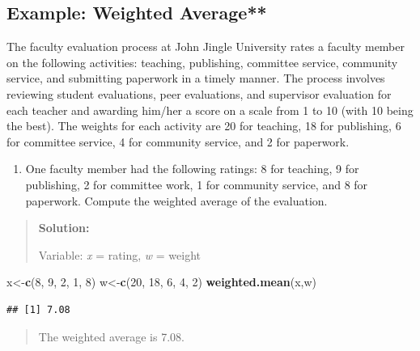 \documentclass[]{book}
\newenvironment{Shaded}{\begin{snugshade}}{\end{snugshade}}
\newcommand{\DecValTok}[1]{\textcolor[rgb]{0.00,0.00,0.81}{#1}}
\newcommand{\KeywordTok}[1]{\textcolor[rgb]{0.13,0.29,0.53}{\textbf{#1}}}
\newcommand{\NormalTok}[1]{#1}
\providecommand{\tightlist}{%
  \setlength{\itemsep}{0pt}\setlength{\parskip}{0pt}}
\begin{document}
\hypertarget{example-weighted-average-1}{%
\subsection{Example: Weighted Average**}\label{example-weighted-average-1}}

The faculty evaluation process at John Jingle University rates a faculty member on the following activities: teaching, publishing, committee service, community service, and submitting paperwork in a timely manner. The process involves reviewing student evaluations, peer evaluations, and supervisor evaluation for each teacher and awarding him/her a score on a scale from 1 to 10 (with 10 being the best). The weights for each activity are 20 for teaching, 18 for publishing, 6 for committee service, 4 for community service, and 2 for paperwork.

\begin{enumerate}
\def\labelenumi{\alph{enumi})}
\tightlist
\item
  One faculty member had the following ratings: 8 for teaching, 9 for publishing, 2 for committee work, 1 for community service, and 8 for paperwork. Compute the weighted average of the evaluation.
\end{enumerate}

\begin{quote}
\textbf{Solution:}

Variable: \emph{x} = rating, \emph{w} = weight
\end{quote}

\begin{Shaded}
\begin{Highlighting}[]
\NormalTok{x<-}\KeywordTok{c}\NormalTok{(}\DecValTok{8}\NormalTok{, }\DecValTok{9}\NormalTok{, }\DecValTok{2}\NormalTok{, }\DecValTok{1}\NormalTok{, }\DecValTok{8}\NormalTok{)}
\NormalTok{w<-}\KeywordTok{c}\NormalTok{(}\DecValTok{20}\NormalTok{, }\DecValTok{18}\NormalTok{, }\DecValTok{6}\NormalTok{, }\DecValTok{4}\NormalTok{, }\DecValTok{2}\NormalTok{)}
\KeywordTok{weighted.mean}\NormalTok{(x,w)}
\end{Highlighting}
\end{Shaded}

\begin{verbatim}
## [1] 7.08
\end{verbatim}

\begin{quote}
The weighted average is 7.08.
\end{quote}
\end{document}

